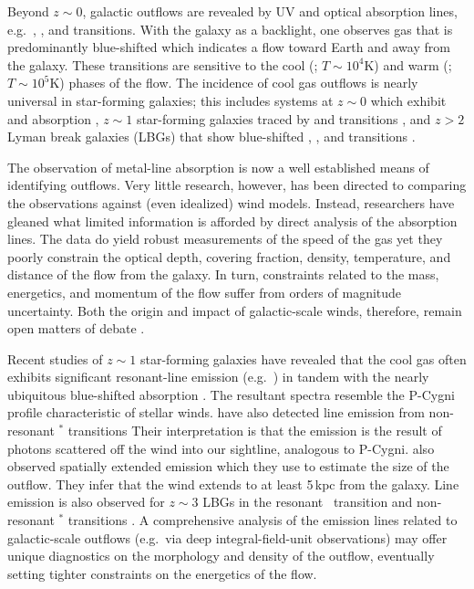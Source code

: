 \documentclass[12pt,preprint]{aastex}
\begin{document}
Beyond $z \sim 0$, galactic outflows are 
revealed by UV and optical absorption lines, e.g.\ ,
,  and  transitions.  With the galaxy
as a backlight, one observes gas that is predominantly
blue-shifted which indicates a flow toward
Earth and away from the galaxy.  These transitions are sensitive to
the cool (; $T \sim 10^4$K) and warm (; $T \sim
10^5$K) phases of the flow.  The incidence of cool gas outflows is
nearly universal in star-forming galaxies;  this includes systems at $z \sim 0$
which exhibit  and  absorption
\citep{rvs05a,martin05,smn+09}, $z \sim 1$ star-forming galaxies traced by
 and  transitions \citep{wcp+09,rwk+10}, and
$z>2$ Lyman break galaxies (LBGs) that show blue-shifted ,
, and  transitions \citep{sgp+96,lkg+97,shapley03}.

The observation of metal-line absorption is now a well established
means of identifying outflows. Very little research,
however,  has been directed
to comparing the observations against (even idealized) wind
models.  Instead, researchers have gleaned what limited information
is afforded by direct analysis of the absorption lines.  The data do yield
robust measurements of the speed of the gas yet they poorly constrain the
optical depth, covering fraction, density, temperature, and distance
of the flow from the galaxy.   In turn, constraints related to the
mass, energetics, and momentum of the flow suffer from
orders of magnitude uncertainty.  Both the origin and impact of
galactic-scale winds, therefore, remain open matters of debate
\citep{debate}.

Recent studies of $z \sim 1$ star-forming galaxies have revealed that
the cool gas often exhibits significant resonant-line emission (e.g.\
) in
tandem with the nearly ubiquitous blue-shifted absorption
\citep{wcp+09,rwk+10}.  The resultant spectra resemble the P-Cygni
profile characteristic of stellar winds.
\cite{rubin+10c} have also detected line
emission from non-resonant $^*$ transitions 
Their interpretation is that the emission is the result of photons
scattered off the wind into our sightline, analogous to P-Cygni.
\cite{rubin+10c} also observed spatially extended \ion{Mg}{2} emission
which they use to estimate the size of the outflow.  They infer that
the wind extends to at least 5\,kpc from the galaxy.  Line emission is
also observed for $z \sim 3$ LBGs in the resonant \lya\ transition
and non-resonant \ion{Si}{2}$^*$ transitions \citep{prs+02,shapley03}.
A comprehensive analysis of the emission lines
related to galactic-scale outflows
(e.g.\ via deep integral-field-unit observations) may offer unique
diagnostics on the morphology and density of the outflow, eventually
setting tighter constraints on the energetics of the flow.  
\end{document}
